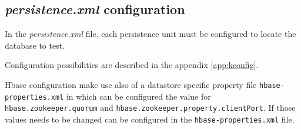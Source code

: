 \subsection{\textit{persistence.xml} configuration}
In the \textit{persistence.xml} file, each persistence unit must be configured to locate the database to test.

\noindent Configuration possibilities are described in the appendix \ref{app:kconfig}.

\noindent Hbase configuration make use also of a datastore specific property file \texttt{hbase-properties.xml} in which can be configured the value for \texttt{hbase.zookeeper.quorum} and \texttt{hbase.zookeeper.property.clientPort}. If those values needs to be changed can be configured in the \texttt{hbase-properties.xml} file.